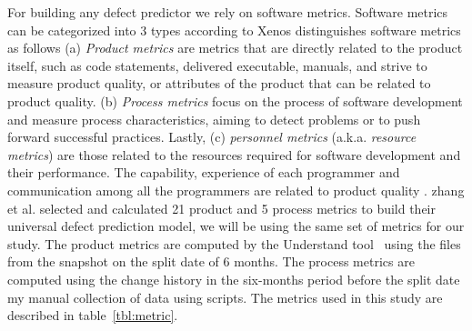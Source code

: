 \documentclass[sigconf]{acmart}
\theoremstyle{break}
\begin{document}
For building any defect predictor we rely on software metrics. Software metrics can be categorized into 3 types according to Xenos \cite{Xenos} distinguishes software metrics as  follows (a) {\em Product metrics} are metrics that are directly related to the product itself, such as code statements, delivered executable, manuals, and strive to measure product quality, or attributes of the product that can be related to product quality. (b) {\em Process metrics} focus on the process of software development and measure process characteristics, aiming to detect problems or to push forward successful practices. Lastly, (c) {\em personnel metrics} (a.k.a. {\em resource metrics}) are those related to the resources required for software development and their performance. The capability, experience of each programmer and communication among all the programmers are related to product quality \cite{wolf2009predicting,de2004sometimes,cataldo2013coordination,cataldo2007coordination}. zhang et al. selected and calculated 21 product and 5 process metrics to build their universal defect prediction model, we will be using the same set of metrics for our study. The product metrics are computed by the Understand tool~\cite{visualize} using the files from the snapshot on the split date of 6 months. The process metrics are computed using the change history in the six-months period before the split date my manual collection of data using scripts. The metrics used in this study are described in table~\ref{tbl:metric}.
\end{document}
